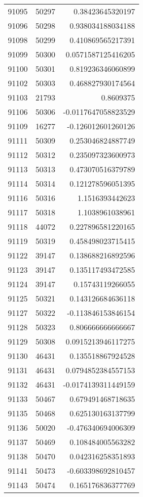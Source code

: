 \begin{tabular}{r | r | r}
91095 & 50297 & 0.38423645320197 \\
91096 & 50298 & 0.938034188034188 \\
91098 & 50299 & 0.410869565217391 \\
91099 & 50300 & 0.0571587125416205 \\
91100 & 50301 & 0.819236346060899 \\
91102 & 50303 & 0.468827930174564 \\
91103 & 21793 & 0.8609375 \\
91106 & 50306 & -0.0117647058823529 \\
91109 & 16277 & -0.126012601260126 \\
91111 & 50309 & 0.253046824887749 \\
91112 & 50312 & 0.235097323600973 \\
91113 & 50313 & 0.473070516379789 \\
91114 & 50314 & 0.121278596051395 \\
91116 & 50316 & 1.1516393442623 \\
91117 & 50318 & 1.1038961038961 \\
91118 & 44072 & 0.227896581220165 \\
91119 & 50319 & 0.458498023715415 \\
91122 & 39147 & 0.138688216892596 \\
91123 & 39147 & 0.135117493472585 \\
91124 & 39147 & 0.15743119266055 \\
91125 & 50321 & 0.143126684636118 \\
91127 & 50322 & -0.113846153846154 \\
91128 & 50323 & 0.806666666666667 \\
91129 & 50308 & 0.0915213946117275 \\
91130 & 46431 & 0.135518867924528 \\
91131 & 46431 & 0.0794852384557153 \\
91132 & 46431 & -0.0174139311449159 \\
91133 & 50467 & 0.679491468718635 \\
91135 & 50468 & 0.625130163137799 \\
91136 & 50020 & -0.476340694006309 \\
91137 & 50469 & 0.108484005563282 \\
91138 & 50470 & 0.042316258351893 \\
91141 & 50473 & -0.603398692810457 \\
91143 & 50474 & 0.165176836377769 \\

\end{tabular}
